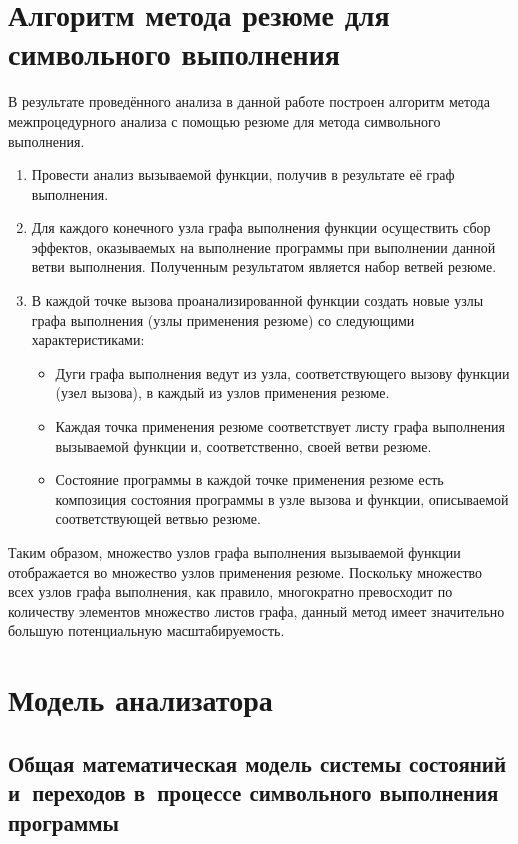 \section{Алгоритм метода резюме для символьного выполнения}

В результате проведённого анализа в данной работе построен алгоритм метода межпроцедурного анализа с помощью резюме для метода символьного выполнения.

\begin{enumerate}
 \item Провести анализ вызываемой функции, получив в результате её граф выполнения.
 \item Для каждого конечного узла графа выполнения функции осуществить сбор эффектов, оказываемых на выполнение программы при выполнении данной ветви выполнения. Полученным результатом является набор ветвей резюме.
 \item В каждой точке вызова проанализированной функции создать новые узлы графа выполнения (узлы применения резюме) со следующими характеристиками:
 \begin{itemize}
  \item Дуги графа выполнения ведут из узла, соответствующего вызову функции (узел вызова), в каждый из узлов применения резюме.
  \item Каждая точка применения резюме соответствует листу графа выполнения вызываемой функции и, соответственно, своей ветви резюме.
  \item Состояние программы в каждой точке применения резюме есть композиция состояния программы в узле вызова и функции, описываемой соответствующей ветвью резюме.
 \end{itemize}
\end{enumerate}

Таким образом, множество узлов графа выполнения вызываемой функции отображается во множество узлов применения резюме. Поскольку множество всех узлов графа выполнения, как правило, многократно превосходит по количеству элементов множество листов графа, данный метод имеет значительно большую потенциальную масштабируемость.


\section{Модель анализатора} \label{sect2_1}
\subsection{Общая математическая модель системы состояний и~переходов в~процессе  символьного выполнения программы}

